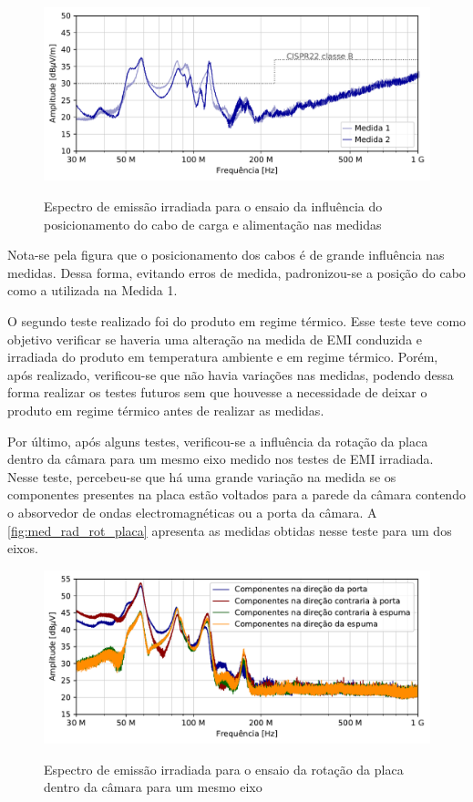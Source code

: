     \begin{figure}[H]
    	\centering
    	\caption{Espectro de emissão irradiada para o ensaio da influência do posicionamento do cabo de carga e alimentação nas medidas}
    	\includegraphics[scale=.9]{pdf/rad/Sem o cuidado com o cabo2.pdf}
    	\label{fig:med_rad_cabo}
    \end{figure}
    
    Nota-se pela figura que o posicionamento dos cabos é de grande influência nas medidas. Dessa forma, evitando erros de medida, padronizou-se a posição do cabo como a utilizada na Medida 1.
    
    O segundo teste realizado foi do produto em regime térmico. Esse teste teve como objetivo verificar se haveria uma alteração na medida de EMI conduzida e irradiada do produto em temperatura ambiente e em regime térmico. Porém, após realizado, verificou-se que não havia variações nas medidas, podendo dessa forma realizar os testes futuros sem que houvesse a necessidade de deixar o produto em regime térmico antes de realizar as medidas. 
    
    Por último, após alguns testes, verificou-se a influência da rotação da placa dentro da câmara para um mesmo eixo medido nos testes de EMI irradiada. Nesse teste, percebeu-se que há uma grande variação na medida se os componentes presentes na placa estão voltados para a parede da câmara contendo o absorvedor de ondas electromagnéticas ou a porta da câmara. A \autoref{fig:med_rad_rot_placa} apresenta as medidas obtidas nesse teste para um dos eixos. 
    
    \begin{figure}[H]
    	\centering
    	\caption{Espectro de emissão irradiada para o ensaio da rotação da placa dentro da câmara para um mesmo eixo}
    	\includegraphics[scale=.9]{pdf/rad/rotacionando.pdf}
    	\label{fig:med_rad_rot_placa}
    \end{figure}
    
